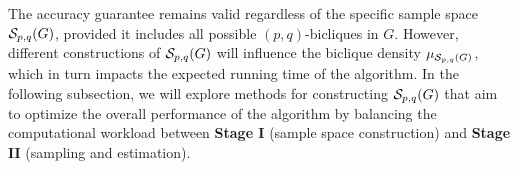 The accuracy guarantee remains valid regardless of the specific sample space $ \mathcal{S}_{p,q}(G) $, provided it includes all possible $ (p,q) $-bicliques in $ G $. However, different constructions of $ \mathcal{S}_{p,q}(G) $ will influence the biclique density $ \mu_{\mathcal{S}_{p,q}(G)} $, which in turn impacts the expected running time of the algorithm. In the following subsection, we will explore methods for constructing $ \mathcal{S}_{p,q}(G) $ that aim to optimize the overall performance of the algorithm by balancing the computational workload between \textbf{Stage I} (sample space construction) and \textbf{Stage II} (sampling and estimation).

